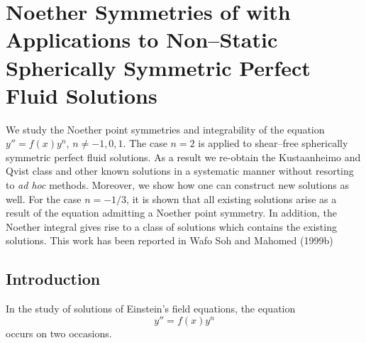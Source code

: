 %

\chapter{Noether Symmetries of  with
Applications to Non--Static Spherically Symmetric Perfect Fluid Solutions}
We study the Noether point symmetries and integrability
of the equation $y''=f(x)y^n$, $n\ne -1, 0, 1$. The
case $n=2$ is applied to shear--free spherically symmetric perfect fluid
solutions. As a result
we re-obtain the Kustaanheimo and Qvist 
class and other known solutions in a systematic manner without
resorting to {\em ad hoc} methods. Moreover, we show how one can construct 
new solutions as well. For the case $n=-1/3$, it is shown that all existing solutions 
arise as a result of the equation admitting a Noether point symmetry.
In addition, the Noether integral gives rise to a class of solutions
which contains the existing solutions. This work has been reported in
Wafo Soh and Mahomed (1999b)
\section{ Introduction}
In the study of solutions of Einstein's field equations, the equation
\begin{equation} y''=f(x)y^n  \label{ch3:i1} \end{equation} occurs on two
occasions. 

